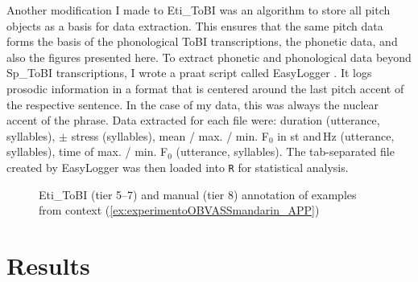 Another modification I made to Eti\_ToBI was an algorithm to store all pitch objects as a basis for data extraction. This ensures that the same pitch data forms the basis of the phonological ToBI transcriptions, the phonetic data, and also the figures presented here. To extract phonetic and phonological data beyond Sp\_ToBI transcriptions, I wrote a praat script called EasyLogger \citep{Fliessbach.2023}. It logs prosodic information in a format that is centered around the last pitch accent of the respective sentence. In the case of my data, this was always the nuclear accent of the phrase. Data extracted for each file were: duration (utterance, syllables), $\pm$ stress (syllables), mean / max. / min. F$_0$ in st and\,Hz (utterance, syllables), time of max. / min. F$_0$ (utterance, syllables). The tab-separated file created by EasyLogger was then loaded into \texttt{R} \citep{Rtool} for statistical analysis.

\begin{sidewaysfigure}
	\centering
{}\hspace{0.5em}%
\hspace{1em}%
%
	\caption[Eti\_ToBI (tier 5--7) and manual (tier 8) annotation of examples from context (\ref{ex:experimentoOBVASSmandarin_APP})]{Eti\_ToBI (tier 5--7) and manual (tier 8) annotation of examples from context (\ref{ex:experimentoOBVASSmandarin_APP})}\label{fig:etitobi_5d}
\end{sidewaysfigure}


\section{Results}
\label{ch:6.2}

